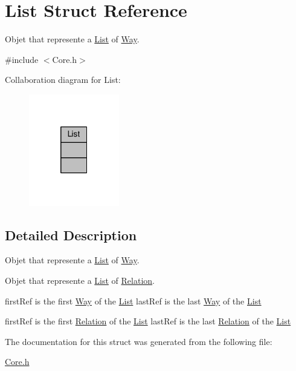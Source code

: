 \hypertarget{structList}{\section{List Struct Reference}
\label{structList}
}


Objet that represente a \hyperlink{structList}{List} of \hyperlink{structWay}{Way}.  




{\ttfamily \#include $<$Core.\-h$>$}



Collaboration diagram for List\-:
\nopagebreak
\begin{figure}[H]
\begin{center}
\leavevmode
\includegraphics[width=112pt]{structList__coll__graph}
\end{center}
\end{figure}


\subsection{Detailed Description}
Objet that represente a \hyperlink{structList}{List} of \hyperlink{structWay}{Way}. 

Objet that represente a \hyperlink{structList}{List} of \hyperlink{structRelation}{Relation}.

first\-Ref is the first \hyperlink{structWay}{Way} of the \hyperlink{structList}{List} last\-Ref is the last \hyperlink{structWay}{Way} of the \hyperlink{structList}{List}

first\-Ref is the first \hyperlink{structRelation}{Relation} of the \hyperlink{structList}{List} last\-Ref is the last \hyperlink{structRelation}{Relation} of the \hyperlink{structList}{List} 

The documentation for this struct was generated from the following file\-:\begin{DoxyCompactItemize}
\item 
\hyperlink{Core_8h}{Core.\-h}\end{DoxyCompactItemize}
